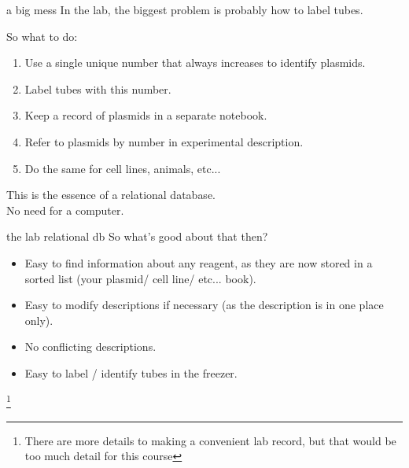 \documentclass[pdf]{beamer}
\newcommand\blfootnote[1]{%
  \begingroup  %
  \renewcommand\thefootnote{}\footnote{#1}%
  \addtocounter{footnote}{-1}  %
  \endgroup
}
\begin{document}
\begin{frame}{a big mess}
  In the lab, the biggest problem is probably how to label tubes.
  \pause

  So what to do:
  \begin{enumerate}
  \item Use a single unique number that always increases to identify plasmids.
  \item Label tubes with this number.
  \item Keep a record of plasmids in a separate notebook.
  \item Refer to plasmids by number in experimental description.
  \item Do the same for cell lines, animals, etc...
  \end{enumerate}

  This is the essence of a relational database.\\
  No need for a computer.
\end{frame}

\begin{frame}{the lab relational db}
  So what's good about that then?
  \begin{itemize}
  \item Easy to find information about any reagent, as
    they are now stored in a sorted list (your plasmid/ cell line/ etc... book).
  \item Easy to modify descriptions if necessary (as the description
    is in one place only).
  \item No conflicting descriptions.
  \item Easy to label / identify tubes in the freezer.
  \end{itemize}
  \blfootnote{There are more details to making a convenient lab record, but
    that would be too much detail for this course}
\end{frame}
\end{document}
